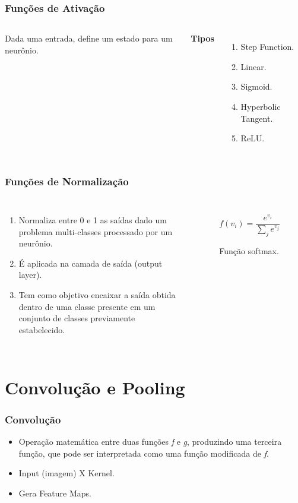 \documentclass{beamer}
\begin{document}
\begin{frame}
\frametitle{Funções de Ativação}

\begin{columns}[c] %

Dada uma entrada, define um estado para um neurônio.

\textbf{Tipos}
\begin{enumerate}
\item Step Function.
\item Linear.
\item Sigmoid.
\item Hyperbolic Tangent.
\item ReLU.
\end{enumerate}
\end{columns}

\end{frame}

\begin{frame}
\frametitle{Funções de Normalização}
\begin{columns}[c]
    \begin{enumerate}
        \item Normaliza entre 0 e 1 as saídas dado um problema multi-classes processado por um neurônio.
        \item É aplicada na camada de saída (output layer).
        \item Tem como objetivo encaixar a saída obtida dentro de uma classe presente em um conjunto de classes previamente estabelecido.
    \end{enumerate}
    \begin{figure}
        \[f(v_i) = \displaystyle\frac{e^{v_i}}{\displaystyle\sum_{j} e^{v_j}}\]
        \caption{Função softmax.}
    \end{figure}
\end{columns}
\end{frame}

\section{Convolução e Pooling}

\begin{frame}
\frametitle{Convolução}
    \begin{itemize}
        \item Operação matemática entre duas funções \textit{f} e \textit{g}, produzindo uma terceira função, que pode ser interpretada como uma função modificada de \textit{f}.
        \item Input (imagem) X Kernel.
        \item Gera Feature Maps.
    \end{itemize}
\end{frame}
\end{document}
